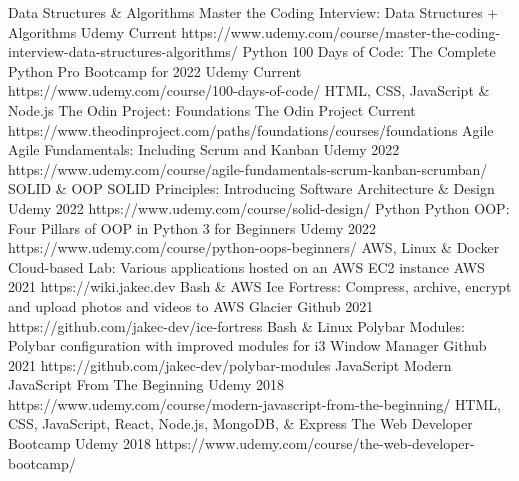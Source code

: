 \begin{cvhonors}
  \cvhonor
    {Data Structures \& Algorithms}
    {Master the Coding Interview: Data Structures + Algorithms}
    {Udemy}
    {Current}
    {https://www.udemy.com/course/master-the-coding-interview-data-structures-algorithms/}
  \cvhonor
    {Python}
    {100 Days of Code: The Complete Python Pro Bootcamp for 2022}
    {Udemy}
    {Current}
    {https://www.udemy.com/course/100-days-of-code/}
  \cvhonor
    {HTML, CSS, JavaScript \& Node.js}
    {The Odin Project: Foundations}
    {The Odin Project}
    {Current}
    {https://www.theodinproject.com/paths/foundations/courses/foundations}
  \cvhonor
    {Agile}
    {Agile Fundamentals: Including Scrum and Kanban}
    {Udemy}
    {2022}
    {https://www.udemy.com/course/agile-fundamentals-scrum-kanban-scrumban/}
  \cvhonor
    {SOLID \& OOP}
    {SOLID Principles: Introducing Software Architecture \& Design}
    {Udemy}
    {2022}
    {https://www.udemy.com/course/solid-design/}
  \cvhonor
    {Python}
    {Python OOP: Four Pillars of OOP in Python 3 for Beginners}
    {Udemy}
    {2022}
    {https://www.udemy.com/course/python-oops-beginners/}
  \cvhonor
    {AWS, Linux \& Docker}
    {Cloud-based Lab: Various applications hosted on an AWS EC2 instance}
    {AWS}
    {2021}
    {https://wiki.jakec.dev}
  \cvhonor
    {Bash \& AWS}
    {Ice Fortress: Compress, archive, encrypt and upload photos and videos to AWS Glacier}
    {Github}
    {2021}
    {https://github.com/jakec-dev/ice-fortress}
  \cvhonor
    {Bash \& Linux}
    {Polybar Modules: Polybar configuration with improved modules for i3 Window Manager}
    {Github}
    {2021}
    {https://github.com/jakec-dev/polybar-modules}
  \cvhonor
    {JavaScript}
    {Modern JavaScript From The Beginning}
    {Udemy}
    {2018}
    {https://www.udemy.com/course/modern-javascript-from-the-beginning/}
  \cvhonor
    {HTML, CSS, JavaScript, React, Node.js, MongoDB, \& Express}
    {The Web Developer Bootcamp}
    {Udemy}
    {2018}
    {https://www.udemy.com/course/the-web-developer-bootcamp/}
\end{cvhonors}
